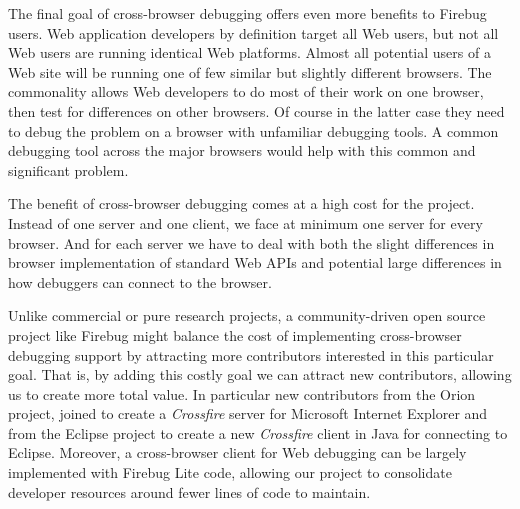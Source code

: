 The final goal of cross-browser debugging offers even more benefits to
Firebug users.  Web application developers by definition target all Web users,
but not all Web users are running identical Web platforms. Almost all
potential users of a Web site will be running one of few similar but slightly
different browsers. The commonality allows Web developers to do most of their
work on one browser, then test for differences on other browsers. Of course in
the latter case they need to debug the problem on a browser with unfamiliar debugging
tools. A common debugging tool across the major browsers would help with this
common and significant problem.

The benefit of cross-browser debugging comes at a high cost for the project.
Instead of one server and one client, we face at minimum one server for every
browser. And for each server we have to deal with both the slight differences in
browser implementation of standard Web APIs and potential large differences in
how debuggers can connect to the browser.


Unlike commercial or pure research projects, a community-driven open source
project like Firebug might balance the cost of implementing cross-browser debugging support by
attracting more contributors interested in this particular goal. That is, by
adding this costly goal we can attract new contributors, allowing us to create
more total value. In particular new contributors from the Orion
project\cite{orion}, joined to create a \textit{Crossfire} server for Microsoft
Internet Explorer and from the Eclipse project\cite{EclipseJSDT} to create a new
\textit{Crossfire} client in Java for connecting to Eclipse. Moreover, a
cross-browser client for Web debugging can be largely implemented with Firebug
Lite code, allowing our project to consolidate developer resources around fewer
lines of code to maintain.


